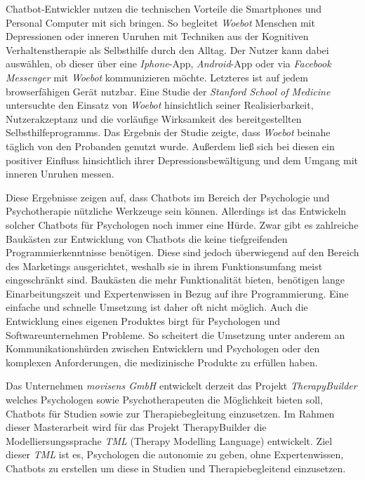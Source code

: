 Chatbot-Entwickler nutzen die technischen Vorteile die Smartphones und Personal Computer mit sich bringen. So begleitet \emph{Woebot} Menschen mit Depressionen oder inneren Unruhen mit Techniken aus der Kognitiven Verhaltenstherapie als Selbsthilfe durch den Alltag. Der Nutzer kann dabei auswählen, ob dieser über eine \emph{Iphone}-App, \emph{Android}-App oder via \emph{Facebook Messenger} mit \emph{Woebot} kommunizieren möchte. Letzteres ist auf jedem browserfähigen Gerät nutzbar. Eine Studie der \emph{Stanford School of Medicine} untersuchte den Einsatz von \emph{Woebot} hinsichtlich seiner Realisierbarkeit, Nutzerakzeptanz und die vorläufige Wirksamkeit des bereitgestellten Selbsthilfeprogramms. Das Ergebnis der Studie zeigte, dass \emph{Woebot} beinahe täglich von den Probanden genutzt wurde. Außerdem ließ sich bei diesen ein positiver Einfluss hinsichtlich ihrer Depressionsbewältigung und dem Umgang mit inneren Unruhen messen.


Diese Ergebnisse zeigen auf, dass Chatbots im Bereich der Psychologie und Psychotherapie nützliche Werkzeuge sein können. Allerdings ist das Entwickeln solcher Chatbots für Psychologen noch immer eine Hürde. Zwar gibt es zahlreiche Baukästen zur Entwicklung von Chatbots die keine tiefgreifenden Programmierkenntnisse benötigen. Diese sind jedoch überwiegend auf den Bereich des Marketings ausgerichtet, weshalb sie in ihrem Funktionsumfang meist eingeschränkt sind. Baukästen die mehr Funktionalität bieten, benötigen lange Einarbeitungszeit und Expertenwissen in Bezug auf ihre Programmierung. Eine einfache und schnelle Umsetzung ist daher oft nicht möglich. Auch die Entwicklung eines eigenen Produktes birgt für Psychologen und Softwareunternehmen Probleme. So scheitert die Umsetzung unter anderem an Kommunikationshürden zwischen Entwicklern und Psychologen oder den komplexen Anforderungen, die medizinische Produkte zu erfüllen haben. 

Das Unternehmen \emph{movisens GmbH} entwickelt derzeit das Projekt \emph{TherapyBuilder} welches Psychologen sowie Psychotherapeuten die Möglichkeit bieten soll, Chatbots  für Studien sowie zur Therapiebegleitung einzusetzen. Im Rahmen dieser Masterarbeit wird für das Projekt TherapyBuilder die Modelliersungssprache \emph{TML} (Therapy Modelling Language) entwickelt. Ziel dieser \emph{TML} ist es, Psychologen die autonomie zu geben, ohne Expertenwissen, Chatbots zu erstellen um diese in Studien und Therapiebegleitend einzusetzen.



